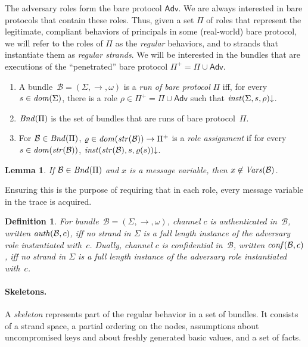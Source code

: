 \documentclass[12pt]{article}
\newcommand{\sdom}{\fn{dom}}
\newcommand{\vars}{\fn{Vars}}
\newcommand{\defd}{\mathord\downarrow}
\newcommand{\bun}{\ensuremath{\mathcal{B}}}
\newcommand{\atom}{basic value}
\newcommand{\ssp}{\Sigma}
\newcommand{\strands}{\sdom}
\newcommand{\str}{\fn{str}}
\newcommand{\run}{\fn{Bnd}}
\newcommand{\nonatomic}{{message}}
\newcounter{running}[section]
\newenvironment{renumerate}{\begin{enumerate}%
\setcounter{enumi}{\value{running}}}%
{\setcounter{running}{\value{enumi}}\end{enumerate}}
\newtheorem{definition}{Definition}
\newtheorem{lemma}{Lemma}
\newcommand{\Adv}{\ensuremath{\mathsf{Adv}}}
\begin{document}
The adversary roles form the bare protocol $\Adv$.  We are always
interested in bare protocols that contain these roles.  Thus, given a set
$\Pi$ of roles that represent the legitimate, compliant behaviors of
principals in some (real-world) bare protocol, we will refer to the roles
of $\Pi$ as the \emph{regular} behaviors, and to strands that
instantiate them as \emph{regular strands}.  We will be interested in
the bundles that are executions of the ``penetrated'' bare protocol
$\Pi^+=\Pi\cup\Adv$.
%
\begin{renumerate}
%
  \item A bundle~$\bun=(\ssp,\to,\omega)$ is a \emph{run of bare
    protocol} $\Pi$ iff, for every $s\in\strands(\ssp)$, there is a
    role $\rho\in\Pi^+=\Pi\cup\Adv$ such that
    $\fn{inst}(\ssp,s,\rho)\defd$.
%
  \item $\run(\Pi)$ is the set of bundles that are runs of bare
    protocol~$\Pi$.

  \item For $\bun\in\run(\Pi)$, $\varrho\in\sdom(\str(\bun))\to\Pi^+$ is a
    \emph{role assignment} if for every $s\in\sdom(\str(\bun))$,
    $\fn{inst}(\str(\bun),s,\varrho(s))\defd$.

\end{renumerate}
%
\begin{lemma}
  If $\bun\in\run(\Pi)$ and $x$ is a {\nonatomic} variable, then
  $x\not\in\vars(\bun)$.
\end{lemma}
%
Ensuring this is the purpose of requiring that in each role, every
{\nonatomic} variable in the trace is acquired.

\begin{definition}
  For bundle~$\bun=(\ssp,\to,\omega)$, channel $c$ is
  \emph{authenticated} in~{\bun}, written $\fn{auth}(\bun,c)$, iff no
  strand in $\ssp$ is a full length instance of the 
  adversary role instantiated with~$c$.  Dually, channel $c$ is
  \emph{confidential} in~{\bun}, written $\fn{conf}(\bun,c)$, iff no
  strand in $\ssp$ is a full length instance of the 
  adversary role instantiated with~$c$.
\end{definition}

\paragraph{Skeletons.}

A \emph{skeleton} represents part of the regular behavior in a set of
bundles.  It consists of a strand space, a partial ordering on the
nodes, assumptions about uncompromised keys and about freshly
generated {\atom}s, and a set of facts.
\end{document}
